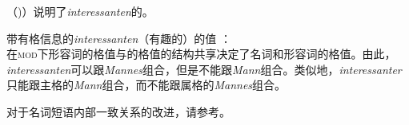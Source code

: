 \begin{enumerate}
\eal
{}
\zl
（)）说明了\emph{interessanten}的\catv 。 

\eas
带有格信息的\emph{interessanten}（有趣的）的\cat 值 ：\\
\zs
在\textsc{mod}下形容词的格值与\nbar 的格值的结构共享决定了名词和形容词的格值。由此，\emph{interessanten}可以跟\emph{Mannes}组合，但是不能跟\emph{Mann}组合。类似地，\emph{interessanter}只能跟主格的\emph{Mann}组合，而不能跟属格的\emph{Mannes}组合。

对于名词短语内部一致关系的改进，请参考。
\end{enumerate}


